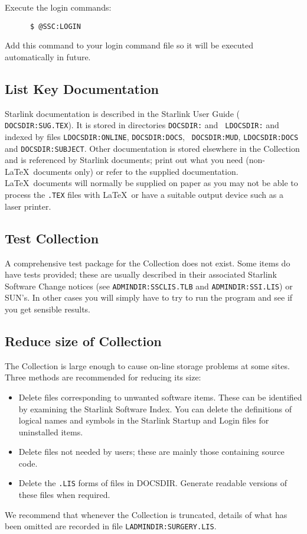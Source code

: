 Execute the login commands:
\begin{verbatim}
      $ @SSC:LOGIN
\end{verbatim}

Add this command to your login command file so it will be executed automatically
in future.

\subsection {List Key Documentation}
\label{ss:listdocs}

Starlink documentation is described in the Starlink User Guide ({\tt 
DOCSDIR:SUG.TEX}). It is stored in directories {\tt DOCSDIR:} and {\tt
LDOCSDIR:} and indexed by files {\tt LDOCSDIR:ONLINE}, {\tt DOCSDIR:DOCS}, {\tt
DOCSDIR:MUD}, {\tt LDOCSDIR:DOCS} and {\tt DOCSDIR:SUBJECT}. Other
documentation is stored elsewhere in the Collection and is referenced by
Starlink documents; print out what you need (non-\LaTeX\ documents only) or
refer to the supplied documentation. \LaTeX\ documents will normally be
supplied on paper as you may not be able to process the {\tt .TEX} files with
\LaTeX\ or have a suitable output device such as a laser printer.

\subsection {Test Collection}
\label{ss:testit}

A comprehensive test package for the Collection does not exist.
Some items do have tests provided; these are usually described in their
associated Starlink Software Change notices (see {\tt ADMINDIR:SSCLIS.TLB} and
{\tt ADMINDIR:SSI.LIS}) or SUN's.
In other cases you will simply have to try to run the program and see if you
get sensible results.

\subsection {Reduce size of Collection}
\label{ss:reduce}

The Collection is large enough to cause on-line storage problems at some sites.
Three methods are recommended for reducing its size:

\begin{itemize}

\item Delete files corresponding to unwanted software items. These can be
identified by examining the Starlink Software Index. You can delete the
definitions of logical names and symbols in the Starlink Startup and Login
files for uninstalled items.

\item Delete files not needed by users; these are mainly those containing
source code.

\item Delete the {\tt .LIS} forms of files in DOCSDIR. Generate readable
versions of these files when required. 

\end{itemize}
We recommend that whenever the Collection is truncated, details of what has been
omitted are recorded in file {\tt LADMINDIR:SURGERY.LIS}.

